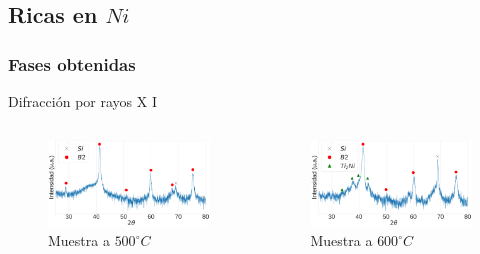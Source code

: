 \documentclass[11pt]{beamer}
\begin{document}
	\subsection{Ricas en $Ni$}	
		\subsubsection{Fases obtenidas}
			\begin{frame}{Difracción por rayos X I}
			\begin{columns}
				\begin{column}{.49\textwidth}
					\begin{figure}
						\includegraphics[scale=0.1]{img/RX/NiRich_500.png}
						\caption*{Muestra a $500 ^\circ C$}
					\end{figure}
				\end{column}
				\begin{column}{.49\textwidth}
					\begin{figure}
						\includegraphics[scale=0.1]{img/RX/NiRich_600.png}
						\caption*{Muestra a $600 ^\circ C$}
					\end{figure}
				\end{column}
			\end{columns}	
			\end{frame}
			
\end{document}
